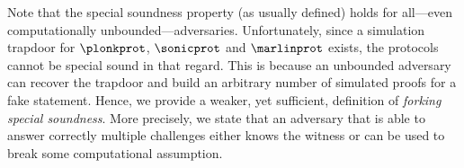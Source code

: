 Note that the special soundness property (as usually defined) holds for
all---even computationally unbounded---adversaries. Unfortunately, since a
simulation trapdoor for $\plonkprot$, $\sonicprot$ and $\marlinprot$ exists, the protocols
cannot be special sound in that regard. This is because an unbounded adversary
can recover the trapdoor and build an arbitrary number of simulated proofs for a fake
statement. Hence, we provide a weaker, yet sufficient, definition of
\emph{forking special soundness}. More precisely, we state that an
adversary that is able to answer correctly multiple challenges either knows the
witness or can be used to break some computational assumption.
